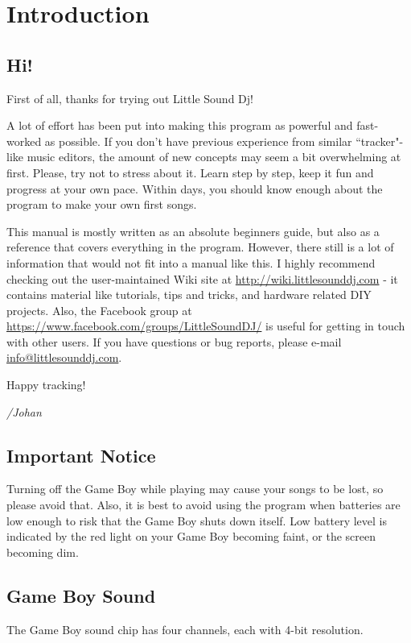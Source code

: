 \chapter{Introduction}
\section{Hi!}
First of all, thanks for trying out Little Sound Dj!

A lot of effort has been put into making this program as powerful and fast-worked
as possible. If you don't have previous experience from similar ``tracker"-like
music editors, the amount of new concepts may seem a bit overwhelming at first.
Please, try not to stress about it. Learn step by step, keep it fun and progress
at your own pace. Within days, you should know enough about the
program to make your own first songs.

This manual is mostly written as an absolute beginners guide, but also as a reference
that covers everything in the program. However, there still
is a lot of information that would not fit into a manual like this. I highly recommend
checking out the user-maintained Wiki site at \url{http://wiki.littlesounddj.com} -
it contains material like tutorials, tips and tricks, and
hardware related DIY projects. Also, the Facebook group
at \url{https://www.facebook.com/groups/LittleSoundDJ/} is useful for getting in touch
with other users.
If you have questions or bug reports, please e-mail
\href{mailto:info@littlesounddj.com}{info@littlesounddj.com}.

Happy tracking!

\textit{/Johan}

\section{Important Notice}

Turning off the Game Boy while playing may cause your songs to be lost, so please avoid that.
Also, it is best to avoid using the program when batteries are low enough to risk that the
Game Boy shuts down itself. Low battery level is indicated by the red light on your Game Boy
becoming faint, or the screen becoming dim.

\section{Game Boy Sound}
The Game Boy sound chip has four channels, each with 4-bit resolution.

